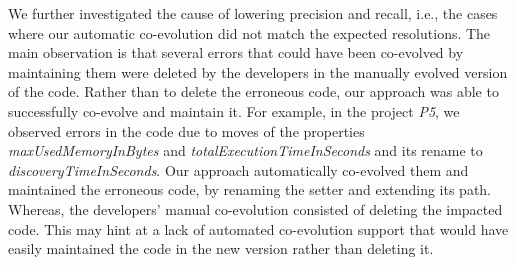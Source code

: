 \begin{table}[t]
	\centering
\caption{Measured precision and recall of our projects.}
\label{table:correctness}
%
\end{table}



We further investigated the cause of lowering precision and recall, i.e., the cases where our automatic co-evolution did not match the expected resolutions. 
The main observation is that several errors that could have been co-evolved by maintaining them were deleted by the developers in the manually evolved version of the code. Rather than to delete the erroneous code, our approach was able to successfully co-evolve and maintain it. 
%
For example, in the project \emph{P5}, we observed errors in the code due to moves of the properties \emph{maxUsedMemoryInBytes} and \emph{totalExecutionTimeInSeconds} and its rename to \emph{discoveryTimeInSeconds}. 
%
Our approach automatically co-evolved them and maintained the erroneous code, by renaming the setter and extending its path. Whereas, the developers' manual co-evolution consisted of deleting the impacted code. This may hint at a lack of automated co-evolution support that would have easily maintained the code in the new version rather than deleting it.  

